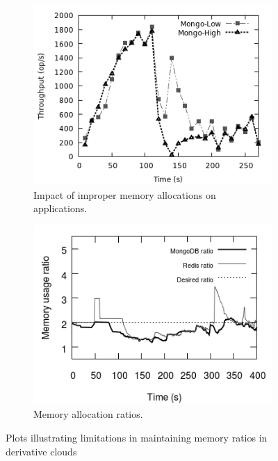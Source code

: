 \begin{figure}
\begin{subfigure}{0.48\textwidth}
		\label{plot_exceed_redis}
	      \end{subfigure}
	    \begin{subfigure}{0.48\textwidth}
		\includegraphics[width=\textwidth]{images/controller_issues/derivative_issues/mongo_throughput.png}
		\caption{\footnotesize Impact of improper memory allocations on \mongo{} applications.}
		\label{plot_throughput_mongo}
	      \end{subfigure}
	      \begin{subfigure}{0.48\textwidth}
		\includegraphics[width=\textwidth]{images/controller_issues/derivative_issues/memory_ratio.png}
		\caption{\footnotesize Memory allocation ratios.}
		\label{plot_inference_ratio}
	      \end{subfigure}
      \caption{Plots illustrating limitations in maintaining memory ratios in derivative clouds}
      \end{figure}
      
